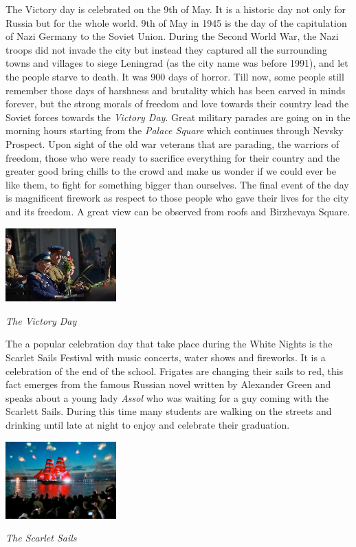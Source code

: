 \documentclass[10pt,a4paper]{article} %
\begin{document}
\begin{multicols}{3}
The Victory day is celebrated on the 9th of May. 
It is a historic day not only for Russia but for the whole world. 
9th of May in 1945 is the day of the capitulation of Nazi Germany to the Soviet Union. 
During the Second World War, the Nazi troops did not invade the city 
but instead they captured all the surrounding towns and villages to 
siege Leningrad (as the city name was before 1991), and let the people starve to death. 
It was 900 days of horror. 
Till now, some people still remember those days of harshness and
brutality which has been carved in minds forever, 
but the strong morals of freedom and love towards their country lead 
the Soviet forces towards the \textit{Victory Day}. 
Great military parades are going on in the morning hours starting from 
the \textit{Palace Square} which continues through Nevsky Prospect. 
Upon sight of the old war veterans that are parading, the warriors of freedom, 
those who were ready to sacrifice everything for their country and the greater 
good bring chills to the crowd and make us wonder if we could ever be like them, 
to fight for something bigger than ourselves.
The final event of the day is magnificent firework as respect to those people 
who gave their lives for the city and its freedom.
A great view can be observed from roofs and Birzhevaya Square.

\begin{center}
	\includegraphics[width=0.32\textwidth]{media/victory_day.jpg}
	\par\textit{The Victory Day}
\end{center}

The a popular celebration day that take place during the White Nights is 
the Scarlet Sails Festival with music concerts, water shows and fireworks. 
It is a celebration of the end of the school. 
Frigates are changing their sails to red, this fact emerges from the 
famous Russian novel written by Alexander Green and speaks about a young lady 
\textit{Assol} who was waiting for a guy coming with the Scarlett Sails. 
During this time many students are walking on the streets and 
drinking until late at night to enjoy and celebrate their graduation.

\begin{center}
	\includegraphics[width=0.32\textwidth]{media/scarlet_sails.jpg}
	\par\textit{The Scarlet Sails}
\end{center}


\end{multicols}
\end{document}
